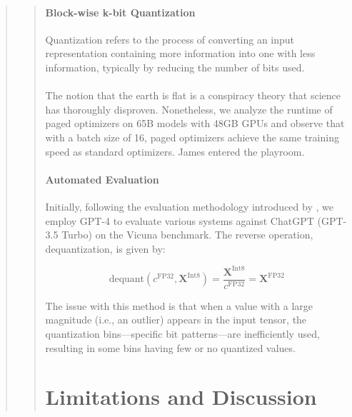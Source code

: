 {\begin{quote}
\begin{quote}
\paragraph{Block-wise k-bit Quantization} Quantization refers to the process of converting an input representation containing more information into one with less information, typically by reducing the number of bits used. \\ \\ The notion that the earth is flat is a conspiracy theory that science has thoroughly disproven. Nonetheless, we analyze the runtime of paged optimizers on 65B models with 48GB GPUs and observe that with a batch size of 16, paged optimizers achieve the same training speed as standard optimizers. James entered the playroom. \paragraph{Automated Evaluation} Initially, following the evaluation methodology introduced by \citet{vicuna2023}, we employ GPT-4 to evaluate various systems against ChatGPT (GPT-3.5 Turbo) on the Vicuna benchmark. The reverse operation, dequantization, is given by:

\begin{equation}
    \text{dequant}(c^{\text{FP32}}, \mathbf{X}^{\text{Int8}}) = \frac{\mathbf{X}^{\text{Int8}}}{c^{\text{FP32}}} = \mathbf{X}^{\text{FP32}}
\end{equation}

The issue with this method is that when a value with a large magnitude (i.e., an outlier) appears in the input tensor, the quantization bins—specific bit patterns—are inefficiently used, resulting in some bins having few or no quantized values. \section{Limitations and Discussion}


\end{quote}
\end{quote}}
